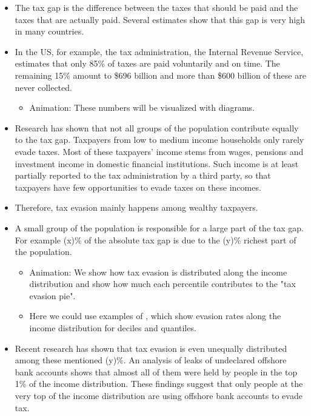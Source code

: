 \documentclass[11pt]{article}
\begin{document}
\begin{itemize}
    \item The tax gap is the difference between the taxes that should be paid and the taxes that are actually paid. Several estimates show that this gap is very high in many countries.
    \item In the US, for example, the tax administration, the Internal Revenue Service, estimates that only 85\% of taxes are paid voluntarily and on time. The remaining 15\% amount to \$696 billion and more than \$600 billion of these are never collected.
    \begin{itemize}
    \item Animation: These numbers will be visualized with diagrams.
    \end{itemize}
    \item Research has shown that not all groups of the population contribute equally to the tax gap. Taxpayers from low to medium income households only rarely evade taxes. Most of these taxpayers’ income stems from wages, pensions and investment income in domestic financial institutions. Such income is at least partially reported to the tax administration by a third party, so that taxpayers have few opportunities to evade taxes on these incomes. 
    \item Therefore, tax evasion mainly happens among wealthy taxpayers.
    \item A small group of the population is responsible for a large part of the tax gap. For example (x)\% of the absolute tax gap is due to the (y)\% richest part of the population. 
    \begin{itemize}
        \item Animation: We show how tax evasion is distributed along the income distribution and show how much each percentile contributes to the "tax evasion pie". 
        \item Here we could use examples of \cite{johns2010distribution}, which show evasion rates along the income distribution for deciles and quantiles.
    \end{itemize}  
    \item Recent research has shown that tax evasion is even unequally distributed among these mentioned (y)\%. An analysis of leaks of undeclared offshore bank accounts shows that almost all of them were held by people in the top 1\% of the income distribution. These findings suggest that only people at the very top of the income distribution are using offshore bank accounts to evade tax.
    \begin{itemize}

\end{itemize}
\end{itemize}
\end{document}
